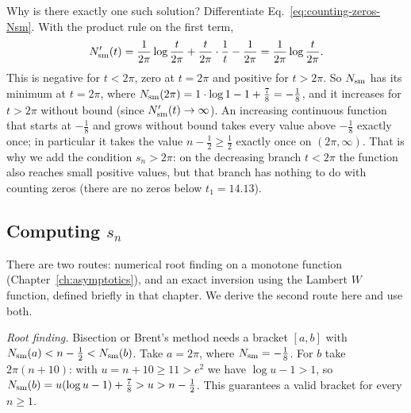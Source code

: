 Why is there exactly one such solution? Differentiate Eq.~\eqref{eq:counting-zeros-Nsm}. With the product rule on the first term,
\begin{equation}
N_{\mathrm{sm}}'(t)=\frac{1}{2\pi}\log\frac{t}{2\pi}+\frac{t}{2\pi}\cdot\frac1t-\frac1{2\pi}=\frac{1}{2\pi}\log\frac{t}{2\pi}.
\label{eq:counting-zeros-Nsmprime}
\end{equation}
This is negative for $t<2\pi$, zero at $t=2\pi$ and positive for $t>2\pi$. So $N_{\mathrm{sm}}$ has its minimum at $t=2\pi$, where $N_{\mathrm{sm}}(2\pi)=1\cdot\log1-1+\tfrac78=-\tfrac18$, and it increases for $t>2\pi$ without bound (since $N_{\mathrm{sm}}'(t)\to\infty$). An increasing continuous function that starts at $-\tfrac18$ and grows without bound takes every value above $-\tfrac18$ exactly once; in particular it takes the value $n-\tfrac12\ge\tfrac12$ exactly once on $(2\pi,\infty)$. That is why we add the condition $s_n>2\pi$: on the decreasing branch $t<2\pi$ the function also reaches small positive values, but that branch has nothing to do with counting zeros (there are no zeros below $t_1=14.13$).

\subsection{Computing $s_n$}

There are two routes: numerical root finding on a monotone function (Chapter~\ref{ch:asymptotics}), and an exact inversion using the Lambert $W$ function, defined briefly in that chapter. We derive the second route here and use both.

\emph{Root finding.} Bisection or Brent's method needs a bracket $[a,b]$ with $N_{\mathrm{sm}}(a)<n-\tfrac12<N_{\mathrm{sm}}(b)$. Take $a=2\pi$, where $N_{\mathrm{sm}}=-\tfrac18$. For $b$ take $2\pi(n+10)$: with $u=n+10\ge11>e^2$ we have $\log u-1>1$, so $N_{\mathrm{sm}}(b)=u(\log u-1)+\tfrac78>u>n-\tfrac12$. This guarantees a valid bracket for every $n\ge1$.

